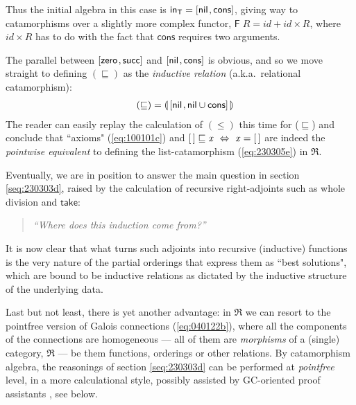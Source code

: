 \documentclass{elsarticle}
\newcommand{\Conid}[1]{\mathit{#1}}
\newcommand{\Varid}[1]{\mathit{#1}}
\renewcommand{\leq}{\leqslant}
\def\alt#1#2{\mathopen{[}#1\hskip 1pt,#2\mathclose{]}}
\def\fun#1{\mathsf{#1}}
\def\cat#1{{\mathfrak #1}}
\def\start{&&}
\begin{document}
Thus the initial algebra in this case is \ensuremath{\mathsf{in}_{\fun T}\mathrel{=}\alt{\mathsf{nil}}{\mathsf{cons}}}, giving way to catamorphisms
over a slightly more complex functor, \ensuremath{\fun F \;\Conid{R}\mathrel{=}{id}\mathbin{+}{id} \times \Conid{R}}, where 
\ensuremath{{id} \times \Conid{R}} has to do with the fact that \ensuremath{\mathsf{cons}} requires two arguments. 

The parallel between \ensuremath{\alt{\mathsf{zero}}{\mathsf{succ}}} and \ensuremath{\alt{\mathsf{nil}}{\mathsf{cons}}} is obvious,
and so we move straight to defining
\ensuremath{(\sqsubseteq )} as the \emph{inductive relation} (a.k.a.\ relational catamorphism): 
\begin{eqnarray}
\start	\ensuremath{(\sqsubseteq )\mathrel{=}\llparenthesis\,\alt{\mathsf{nil}}{{\mathsf{nil}}\mathbin\cup{\mathsf{cons}}}\,\rrparenthesis}
	\label{eq:230305e}
\end{eqnarray}
The reader can easily replay the calculation of \ensuremath{(\leq )} this time for (\ensuremath{\sqsubseteq }) and conclude that
``axioms" (\ref{eq:100101c}) and \ensuremath{[\mskip1.5mu \mskip1.5mu]\sqsubseteq \Varid{x}~\Leftrightarrow~\Varid{x}\mathrel{=}[\mskip1.5mu \mskip1.5mu]} are indeed the \emph{pointwise equivalent}
to defining the list-catamorphism (\ref{eq:230305e}) in \ensuremath{\cat{R}}. 

Eventually, we are in position to answer the main question in section \ref{seq:230303d},
raised by the calculation of recursive right-adjoints such as whole division and \ensuremath{\mathsf{take}}:
\begin{quote}\em
``Where does this induction come from?''
\end{quote}
It is now clear that what turns such adjoints into recursive (inductive) functions is the very
nature of the partial orderings that express them as ``best solutions", which are bound to be
inductive relations as dictated by the inductive structure of the underlying data.

Last but not least, there is yet another advantage:
in \ensuremath{\cat{R}} we can resort to the pointfree version of Galois connections
(\ref{eq:040122b}), where all the components of the connections are homogeneous --- all of them
are \emph{morphisms} of a (single) category, \ensuremath{\cat{R}} --- be them functions, orderings or other relations.
By catamorphism algebra, the reasonings
of section \ref{seq:230303d} can be performed at \emph{pointfree} level, in a more calculational
style, possibly assisted by GC-oriented proof assistants \cite{SO08}, see below.
\end{document}
